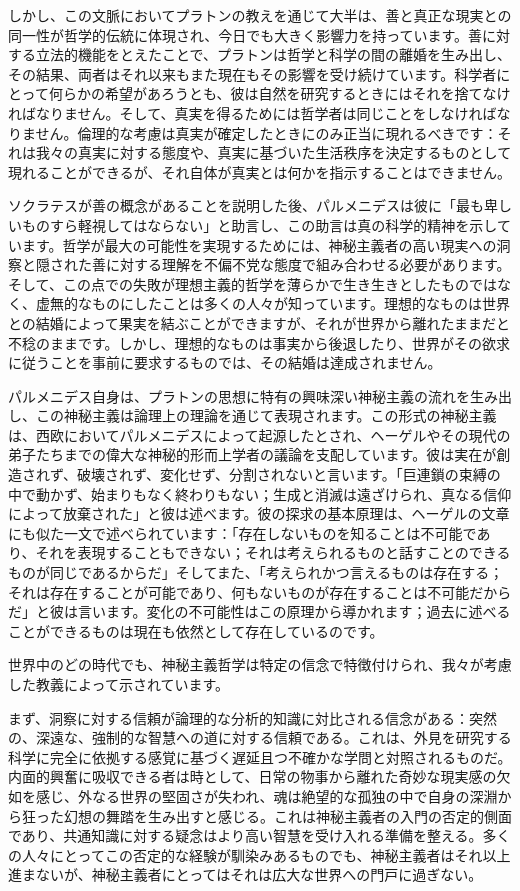 \documentclass[a4paper,11pt,openany]{ltjsbook}
\begin{document}
しかし、この文脈においてプラトンの教えを通じて大半は、善と真正な現実との同一性が哲学的伝統に体現され、今日でも大きく影響力を持っています。善に対する立法的機能をとえたことで、プラトンは哲学と科学の間の離婚を生み出し、その結果、両者はそれ以来もまた現在もその影響を受け続けています。科学者にとって何らかの希望があろうとも、彼は自然を研究するときにはそれを捨てなければなりません。そして、真実を得るためには哲学者は同じことをしなければなりません。倫理的な考慮は真実が確定したときにのみ正当に現れるべきです：それは我々の真実に対する態度や、真実に基づいた生活秩序を決定するものとして現れることができるが、それ自体が真実とは何かを指示することはできません。

ソクラテスが善の概念があることを説明した後、パルメニデスは彼に「最も卑しいものすら軽視してはならない」と助言し、この助言は真の科学的精神を示しています。哲学が最大の可能性を実現するためには、神秘主義者の高い現実への洞察と隠された善に対する理解を不偏不党な態度で組み合わせる必要があります。そして、この点での失敗が理想主義的哲学を薄らかで生き生きとしたものではなく、虚無的なものにしたことは多くの人々が知っています。理想的なものは世界との結婚によって果実を結ぶことができますが、それが世界から離れたままだと不稔のままです。しかし、理想的なものは事実から後退したり、世界がその欲求に従うことを事前に要求するものでは、その結婚は達成されません。

パルメニデス自身は、プラトンの思想に特有の興味深い神秘主義の流れを生み出し、この神秘主義は論理上の理論を通じて表現されます。この形式の神秘主義は、西欧においてパルメニデスによって起源したとされ、ヘーゲルやその現代の弟子たちまでの偉大な神秘的形而上学者の議論を支配しています。彼は実在が創造されず、破壊されず、変化せず、分割されないと言います。「巨連鎖の束縛の中で動かず、始まりもなく終わりもない；生成と消滅は遠ざけられ、真なる信仰によって放棄された」と彼は述べます。彼の探求の基本原理は、ヘーゲルの文章にも似た一文で述べられています：「存在しないものを知ることは不可能であり、それを表現することもできない；それは考えられるものと話すことのできるものが同じであるからだ」そしてまた、「考えられかつ言えるものは存在する；それは存在することが可能であり、何もないものが存在することは不可能だからだ」と彼は言います。変化の不可能性はこの原理から導かれます；過去に述べることができるものは現在も依然として存在しているのです。

世界中のどの時代でも、神秘主義哲学は特定の信念で特徴付けられ、我々が考慮した教義によって示されています。

まず、洞察に対する信頼が論理的な分析的知識に対比される信念がある：突然の、深遠な、強制的な智慧への道に対する信頼である。これは、外見を研究する科学に完全に依拠する感覚に基づく遅延且つ不確かな学問と対照されるものだ。内面的興奮に吸収できる者は時として、日常の物事から離れた奇妙な現実感の欠如を感じ、外なる世界の堅固さが失われ、魂は絶望的な孤独の中で自身の深淵から狂った幻想の舞踏を生み出すと感じる。これは神秘主義者の入門の否定的側面であり、共通知識に対する疑念はより高い智慧を受け入れる準備を整える。多くの人々にとってこの否定的な経験が馴染みあるものでも、神秘主義者はそれ以上進まないが、神秘主義者にとってはそれは広大な世界への門戸に過ぎない。
\end{document}
